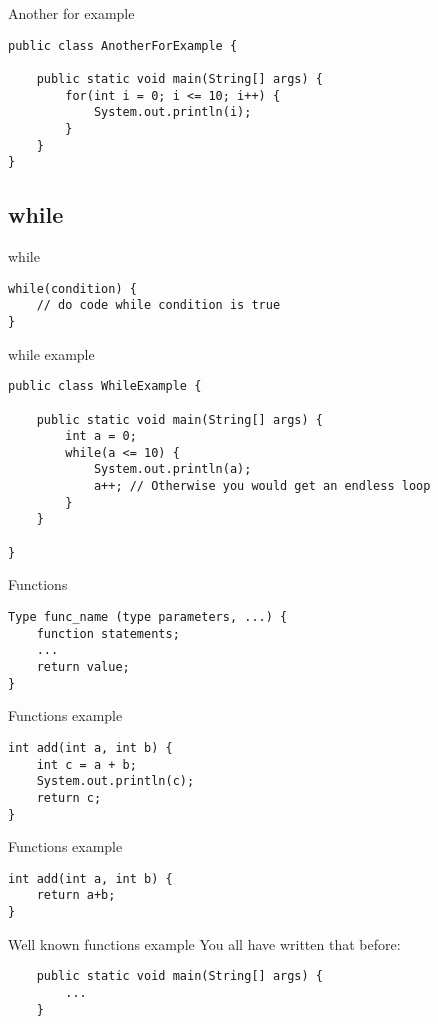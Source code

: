 \begin{frame}[fragile]{Another for example}
	\begin{lstlisting}
public class AnotherForExample {

	public static void main(String[] args) {
		for(int i = 0; i <= 10; i++) {
			System.out.println(i);
		}
	}
}	
	\end{lstlisting}
\end{frame}

\subsection{while}
\begin{frame}[fragile]{while}
\begin{lstlisting}
while(condition) {
	// do code while condition is true
}
\end{lstlisting}
\end{frame}
	
\begin{frame}[fragile]{while example}
\begin{lstlisting}
public class WhileExample {

	public static void main(String[] args) {
		int a = 0;
		while(a <= 10) {
			System.out.println(a);
            a++; // Otherwise you would get an endless loop
		}
	}
    
}
\end{lstlisting}
\end{frame}

\begin{frame}[fragile]{Functions}
	\begin{lstlisting}
Type func_name (type parameters, ...) {
	function statements;
	...
	return value;
}
	\end{lstlisting}
\end{frame}
\begin{frame}[fragile]{Functions example}
	\begin{lstlisting}
int add(int a, int b) {
	int c = a + b;
	System.out.println(c);
	return c;
}
	\end{lstlisting}
\end{frame}

\begin{frame}[fragile]{Functions example}
	\begin{lstlisting}
int add(int a, int b) {
	return a+b;
}
	\end{lstlisting}
\end{frame}

\begin{frame}[fragile]{Well known functions example}
	You all have written that before:
	\begin{lstlisting}
	public static void main(String[] args) {
		...
	}
	\end{lstlisting}
\end{frame}

